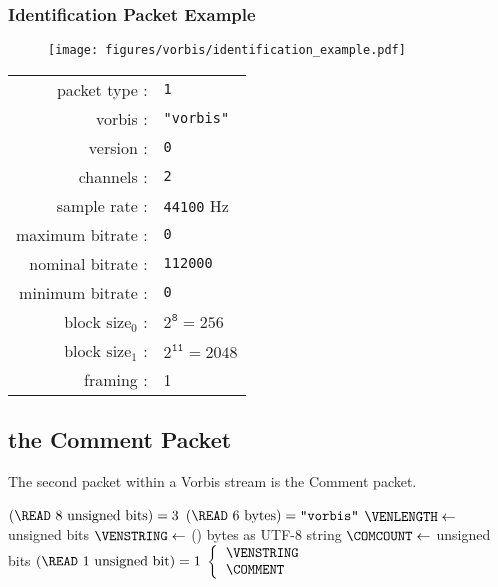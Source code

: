 \clearpage

\subsubsection{Identification Packet Example}

\begin{figure}[h]
  \texttt{[image: figures/vorbis/identification\_example.pdf]}
\end{figure}
{
\begin{tabular}{rl}
packet type : & \texttt{1} \\
vorbis : & \texttt{"vorbis"} \\
version : & \texttt{0} \\
channels : & \texttt{2} \\
sample rate : & \texttt{44100} Hz \\
maximum bitrate : & \texttt{0} \\
nominal bitrate : & \texttt{112000} \\
minimum bitrate : & \texttt{0} \\
$\text{block size}_0$ : & $2 ^ \texttt{8} = 256$ \\
$\text{block size}_1$ : & $2 ^ \texttt{11} = 2048$ \\
framing : & 1 \\
\end{tabular}
}

\clearpage

\subsection{the Comment Packet}
\label{vorbiscomment}
The second packet within a Vorbis stream is the Comment packet.
\par
\noindent
{
\ASSERT $(\text{\READ 8 unsigned bits}) = 3$
\ASSERT $(\text{\READ 6 bytes}) = \texttt{"vorbis"}$\;
\BlankLine
$\VENLENGTH \leftarrow$  unsigned bits\;
$\VENSTRING \leftarrow$ \READ (\VENLENGTH) bytes as UTF-8 string\;
$\COMCOUNT \leftarrow$  unsigned bits\;
\ASSERT $\text{(\READ 1 unsigned bit)} = 1$
\BlankLine
\Return $\left\lbrace\begin{tabular}{l}
\VENSTRING \\
\COMMENT \\
\end{tabular}\right.$\;
\EALGORITHM
}

